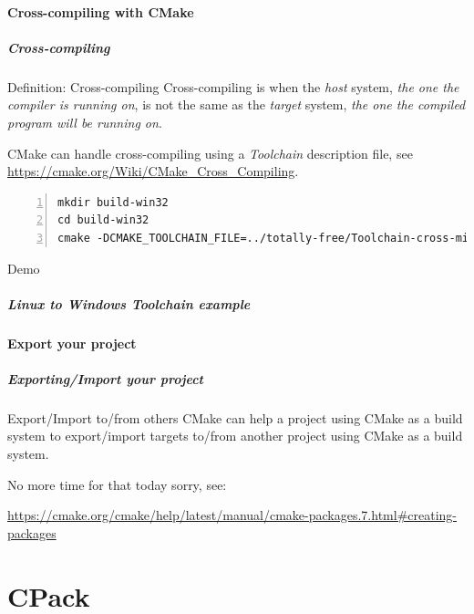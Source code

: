 \documentclass[compress,slidestop,table
              ]
               {beamer}
\begin{document}
\subsection{Cross-compiling with CMake}
\begin{frame}[fragile]
\frametitle{Cross-compiling}
\begin{block}{Definition: Cross-compiling}
Cross-compiling is when the \emph{host} system,
\textsl{the one the compiler is running on},
is not the same as the \emph{target} system,
\textsl{the one the compiled program will be running on}.
\end{block}
CMake can handle cross-compiling using a \emph{Toolchain} description file,
see \url{https://cmake.org/Wiki/CMake_Cross_Compiling}.
\begin{Verbatim}[fontsize=\tiny,numbers=left]
mkdir build-win32
cd build-win32
cmake -DCMAKE_TOOLCHAIN_FILE=../totally-free/Toolchain-cross-mingw32-linux.cmake ../totally-free/
\end{Verbatim}
\begin{center}
{\Large
\alert{Demo}
}
\end{center}

\end{frame}

\begin{frame}[fragile]
  \frametitle{Linux to Windows Toolchain example}
  
\end{frame}

\subsection{Export your project}
\begin{frame}
\frametitle{Exporting/Import your project}

\begin{block}{Export/Import to/from others}
CMake can help a project using CMake as a build system to
export/import targets to/from another project using CMake
as a build system.
\end{block}

No more time for that today sorry, see:

\url{https://cmake.org/cmake/help/latest/manual/cmake-packages.7.html\#creating-packages}
\end{frame}

\part{CPack}
\end{document}
